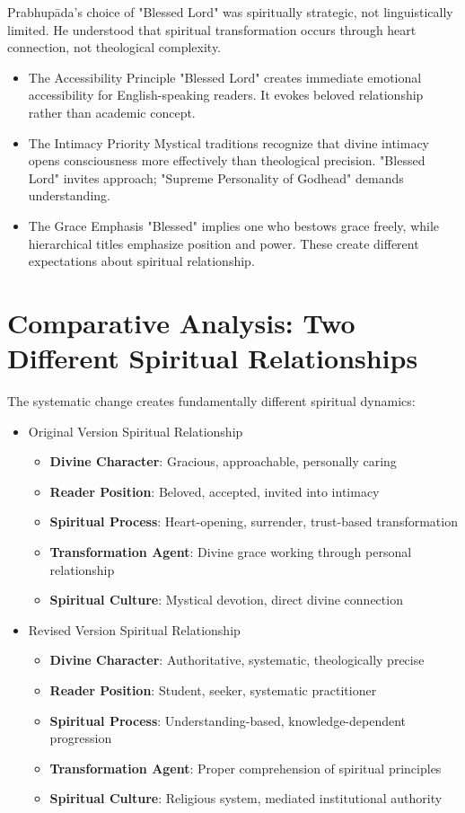 \documentclass[11pt,twoside]{book}
\begin{document}
Prabhupāda's choice of "Blessed Lord" was spiritually strategic, not linguistically limited. He understood that spiritual transformation occurs through heart connection, not theological complexity.
\begin{itemize}
\item The Accessibility Principle
\label{sec:orge70f2e5}
"Blessed Lord" creates immediate emotional accessibility for English-speaking readers. It evokes beloved relationship rather than academic concept.
\item The Intimacy Priority
\label{sec:orgc056ff8}
Mystical traditions recognize that divine intimacy opens consciousness more effectively than theological precision. "Blessed Lord" invites approach; "Supreme Personality of Godhead" demands understanding.
\item The Grace Emphasis
\label{sec:orgdc938e8}
"Blessed" implies one who bestows grace freely, while hierarchical titles emphasize position and power. These create different expectations about spiritual relationship.
\end{itemize}
\section*{Comparative Analysis: Two Different Spiritual Relationships}
\label{sec:orgbfec438}

The systematic change creates fundamentally different spiritual dynamics:
\begin{itemize}
\item Original Version Spiritual Relationship
\label{sec:orgbac57d5}
\begin{itemize}
\item \textbf{\textbf{Divine Character}}: Gracious, approachable, personally caring
\item \textbf{\textbf{Reader Position}}: Beloved, accepted, invited into intimacy
\item \textbf{\textbf{Spiritual Process}}: Heart-opening, surrender, trust-based transformation
\item \textbf{\textbf{Transformation Agent}}: Divine grace working through personal relationship
\item \textbf{\textbf{Spiritual Culture}}: Mystical devotion, direct divine connection
\end{itemize}
\item Revised Version Spiritual Relationship
\label{sec:orgc923848}
\begin{itemize}
\item \textbf{\textbf{Divine Character}}: Authoritative, systematic, theologically precise
\item \textbf{\textbf{Reader Position}}: Student, seeker, systematic practitioner
\item \textbf{\textbf{Spiritual Process}}: Understanding-based, knowledge-dependent progression
\item \textbf{\textbf{Transformation Agent}}: Proper comprehension of spiritual principles
\item \textbf{\textbf{Spiritual Culture}}: Religious system, mediated institutional authority
\end{itemize}
\end{itemize}
\end{document}
